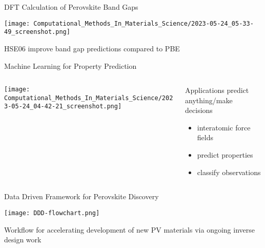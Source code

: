 \documentclass[10pt, aspectratio=169, presentation]{beamer}
\begin{document}
\begin{frame}[label={sec:org63400d4}]{DFT Calculation of Perovskite Band Gaps}
\begin{center}
\texttt{[image: Computational\_Methods\_In\_Materials\_Science/2023-05-24\_05-33-49\_screenshot.png]}
\end{center}

HSE06 improve band gap predictions compared to PBE\autocite{chan-2010-effic-band}
\end{frame}

\begin{frame}[label={sec:orgf033f5e}]{Machine Learning for Property Prediction}
\begin{columns}
\begin{column}{0.7\columnwidth}
\begin{center}
\texttt{[image: Computational\_Methods\_In\_Materials\_Science/2023-05-24\_04-42-21\_screenshot.png]}
\end{center}
\end{column}


\begin{column}{0.3\columnwidth}
\begin{block}{Applications}
predict anything/make decisions\autocite{pablo-2019-new-front}
\begin{itemize}
\item interatomic force fields
\item predict properties
\item classify observations
\end{itemize}
\end{block}
\end{column}
\end{columns}
\end{frame}

\begin{frame}[label={sec:org5b45468}]{Data Driven Framework for Perovskite Discovery}
\begin{center}
\texttt{[image: DDD-flowchart.png]}
\end{center}
\center{}\vspace{-0.75cm}Workflow for accelerating development of new PV materials
\autocite{yang-2023-high-throug}
via ongoing inverse design work
\autocite{yang-2023-discov-novel}
\end{frame}
\end{document}
